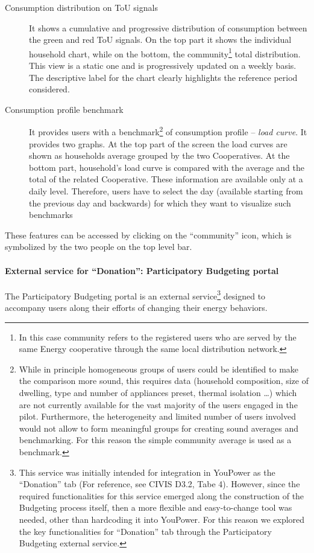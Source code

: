 \begin{description}
 \item[Consumption distribution on ToU signals] It shows a cumulative and progressive distribution of consumption between the green and red ToU signals.
 On the top part it shows the individual household chart, while on the bottom, the community\footnote{In this case community refers to the registered users who 
 are served by the same Energy cooperative through the same local distribution network.} total distribution. This view is a static one and is progressively updated on a weekly basis. The descriptive label for the chart clearly highlights the reference period considered.
 \item[Consumption profile benchmark] It provides users with a benchmark\footnote{While in principle homogeneous groups of users could be identified to make the comparison more sound, this requires data (household composition, size of dwelling, type and number of appliances preset, thermal isolation \ldots) which are not currently available for the vast majority of the users engaged in the pilot.
 Furthermore, the heterogeneity and limited number of users involved would not allow to form meaningful groups for creating sound averages and benchmarking. For this reason the simple community average is used as a benchmark.} of consumption profile -- \textit{load curve}.
 It provides two graphs. At the top part of the screen the load curves are shown as households average grouped by the two Cooperatives.
 At the bottom part, household's load curve is compared with the average and the total of the related Cooperative. These information are available only at a daily level. Therefore, users have to select the day (available starting from the previous day and backwards) for which they want to visualize such benchmarks
\end{description}
These features can be accessed by clicking on the ``community'' icon, which is symbolized by the two people on the top level bar.


\paragraph{External service for ``Donation'': Participatory Budgeting portal} 

The Participatory Budgeting portal is an external service\footnote{This service was initially intended for integration in YouPower as the ``Donation'' tab
(For reference, see CIVIS D3.2, Tabe 4). However, since the required functionalities for this service emerged along the construction of the Budgeting process itself, then a more flexible
and easy-to-change tool was needed, other than hardcoding it into YouPower. For this reason we explored the key functionalities for ``Donation'' tab through the Participatory Budgeting external service.}
designed to accompany users along their efforts of changing their energy behaviors.

